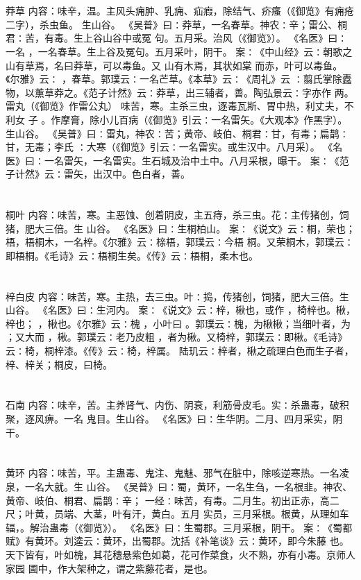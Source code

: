 \documentclass[12pt,UTF8]{ctexbook}
\begin{document}
\chapter{}莽草
内容：味辛，温。主风头痈肿、乳痈、疝瘕，除结气、疥瘙（《御览》有痈疮二字），杀虫鱼。 
生山谷。 
《吴普》曰∶莽草，一名春草。神农∶辛；雷公、桐君∶苦，有毒。生上谷山谷中或冤 
句。五月采。治风（《御览》）。 
《名医》曰∶一名 ，一名春草。生上谷及冤句。五月采叶，阴干。 
案∶《中山经》云∶朝歌之山有草焉，名曰莽草，可以毒鱼。又 山有木焉，其状如棠 
而赤，叶可以毒鱼。《尔雅》云∶ ，春草。郭璞云∶一名芒草。《本草》云∶《周礼》云 
∶翦氏掌除蠹物，以薰草莽之。《范子计然》云∶莽草，出三辅者，善。陶弘景云∶字亦作 
两。 
雷丸（《御览》作雷公丸） 味苦，寒。主杀三虫，逐毒瓦斯、胃中热，利丈夫，不利女 
子 
。作摩膏，除小儿百病（《御览》引云∶一名雷矢。《大观本》作黑字）。生山谷。 
《吴普》曰∶雷丸，神农∶苦；黄帝、岐伯、桐君∶甘，有毒；扁鹊∶甘，无毒；李氏 
∶大寒（《御览》引云∶一名雷实。或生汉中。八月采）。 
《名医》曰∶一名雷矢，一名雷实。生石城及治中土中。八月采根，曝干。 
案∶《范子计然》云∶雷矢，出汉中。色白者，善。 


\chapter{}桐叶
内容：味苦，寒。主恶蚀、创着阴皮，主五痔，杀三虫。花∶主传猪创，饲猪，肥大三倍。生 
山谷。 
《名医》曰∶生桐柏山。 
案∶《说文》云∶桐，荣也；梧，梧桐木，一名梓。《尔雅》云∶榇梧，郭璞云∶今梧 
桐。又荣桐木，郭璞云∶即梧桐。《毛诗》云∶梧桐生矣。《传》云∶梧桐，柔木也。 


\chapter{}梓白皮
内容：味苦，寒。主热，去三虫。叶∶捣，传猪创，饲猪，肥大三倍。生山谷。 
《名医》曰∶生河内。 
案∶《说文》云∶梓，楸也，或作 ，椅梓也。楸，梓也； ，楸也。《尔雅》云∶槐 
，小叶曰 。郭璞云∶槐，为楸楸；当细叶者，为 ；又大而 ，楸。郭璞云∶老乃皮粗 
，者为楸。又椅梓，郭璞云∶即楸。《毛诗》云∶椅，桐梓漆。《传》云∶椅，梓属。 
陆玑云∶梓者，楸之疏理白色而生子者，梓、梓关；桐皮，曰椅。 


\chapter{}石南
内容：味辛，苦。主养肾气、内伤、阴衰，利筋骨皮毛。实∶杀蛊毒，破积聚，逐风痹。一名 
鬼目。生山谷。 
《名医》曰∶生华阴。二月、四月采实，阴干。 


\chapter{}黄环
内容：味苦，平。主蛊毒、鬼注、鬼魅、邪气在脏中，除咳逆寒热。一名凌泉，一名大就。生 
山谷。 
《吴普》曰∶蜀，黄环，一名生刍，一名根韭。神农、黄帝、岐伯、桐君、扁鹊∶辛； 
一经∶味苦，有毒。二月生。初出正赤，高二尺；叶黄，员端、大茎，叶有汗，黄白。五月 
实员，三月采根。根黄，从理如车辐，。解治蛊毒（《御览》）。 
《名医》曰∶生蜀郡。三月采根，阴干。 
案∶《蜀都赋》有黄环。刘逵云∶黄环，出蜀郡。沈括《补笔谈》云∶黄环，即今朱藤 
也。天下皆有，叶如槐，其花穗悬紫色如葛，花可作菜食，火不熟，亦有小毒。京师人家园 
圃中，作大架种之，谓之紫藤花者，是也。 
\end{document}
